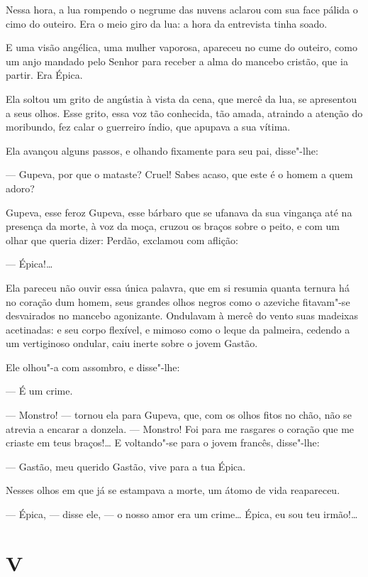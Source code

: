 Nessa hora, a lua rompendo o negrume das nuvens aclarou com sua face
pálida o cimo do outeiro. Era o meio giro da lua: a hora da entrevista
tinha soado.

E uma visão angélica, uma mulher vaporosa, apareceu no cume do outeiro,
como um anjo mandado pelo Senhor para receber a alma do mancebo cristão,
que ia partir. Era Épica.

Ela soltou um grito de angústia à vista da cena, que mercê da lua, se
apresentou a seus olhos. Esse grito, essa voz tão conhecida, tão amada,
atraindo a atenção do moribundo, fez calar o guerreiro índio, que
apupava a sua vítima.

Ela avançou alguns passos, e olhando fixamente para seu pai, disse"-lhe:

--- Gupeva, por que o mataste? Cruel! Sabes acaso, que este é o homem a
quem adoro?

Gupeva, esse feroz Gupeva, esse bárbaro que se ufanava da sua vingança
até na presença da morte, à voz da moça, cruzou os braços sobre o peito,
e com um olhar que queria dizer: Perdão, exclamou com aflição:

--- Épica!\ldots{}

Ela pareceu não ouvir essa única palavra, que em si resumia quanta
ternura há no coração dum homem, seus grandes olhos negros como o
azeviche fitavam"-se desvairados no mancebo agonizante. Ondulavam à mercê
do vento suas madeixas acetinadas: e seu corpo flexível, e mimoso como o
leque da palmeira, cedendo a um vertiginoso ondular, caiu inerte sobre o
jovem Gastão.

Ele olhou"-a com assombro, e disse"-lhe:

--- É um crime.

--- Monstro! --- tornou ela para Gupeva, que, com os olhos fitos no chão,
não se atrevia a encarar a donzela. --- Monstro! Foi para me rasgares o
coração que me criaste em teus braços!\ldots{} E voltando"-se para o jovem
francês, disse"-lhe:

--- Gastão, meu querido Gastão, vive para a tua Épica.

Nesses olhos em que já se estampava a morte, um átomo de vida
reapareceu.

--- Épica, --- disse ele, --- o nosso amor era um crime\ldots{} Épica, eu sou
teu irmão!\ldots{}

\section{V}

